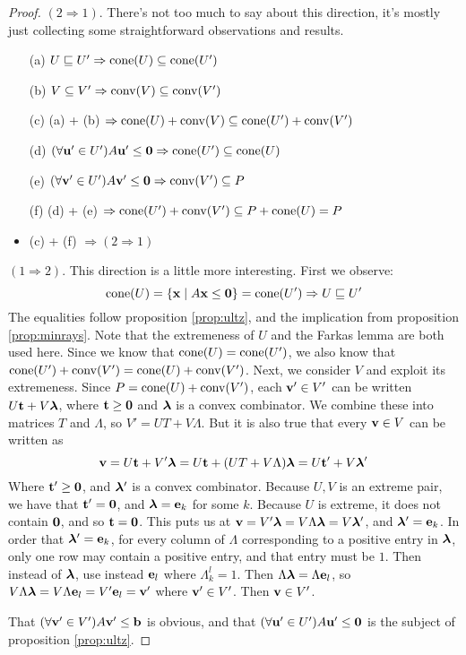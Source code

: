 \begin{proof}
	$(2 \Rightarrow 1)$.  There's not too much to say about this direction, it's mostly just collecting some straightforward observations and results.
	\begin{itemize}
		\item[(a)] $U \sqsubseteq U' \Rightarrow \operatorname{cone}(U) \subseteq \operatorname{cone}(U')$
		\item[(b)] $V \subseteq V' \Rightarrow \operatorname{conv}(V) \subseteq \operatorname{conv}(V')$
		\item[(c)] (a) + (b) $\Rightarrow \operatorname{cone}(U)+\operatorname{conv}(V) \subseteq \operatorname{cone}(U') + \operatorname{conv}(V')$
		\item[(d)] $(\forall \mathbf{u}'\in U') A\mathbf{u}' \leq \mathbf{0} \Rightarrow \operatorname{cone}(U') \subseteq \operatorname{cone}(U)$
		\item[(e)] $(\forall \mathbf{v}'\in U') A\mathbf{v}' \leq \mathbf{0} \Rightarrow \operatorname{conv}(V') \subseteq P$
		\item[(f)] (d) + (e) $\Rightarrow \operatorname{cone}(U') + \operatorname{conv}(V') \subseteq P + \operatorname{cone}(U) = P$
		\item (c) + (f) $\Rightarrow (2 \Rightarrow 1)$
	\end{itemize}

	$(1 \Rightarrow 2)$.  This direction is a little more interesting.  First we observe:
	\[ \operatorname{cone}(U) = \left\{\mathbf{x}\;|\; A\mathbf{x}\leq\mathbf{0}\right\} = \operatorname{cone}(U') \Rightarrow U \sqsubseteq U' \]
	The equalities follow proposition \ref{prop:ultz}, and the implication from proposition \ref{prop:minrays}.  Note that the extremeness of $U$ and the Farkas lemma are both used here.  Since we know that $\operatorname{cone}(U) = \operatorname{cone}(U')$, we also know that $\operatorname{cone}(U') + \operatorname{conv}(V') = \operatorname{cone}(U) + \operatorname{conv}(V')$.  Next, we consider $V$ and exploit its extremeness.  Since $P = \operatorname{cone}(U) + \operatorname{conv}(V')$, each $\mathbf{v}'\in V'$ can be written $U\mathbf{t} + V\bm{\lambda}$, where $\mathbf{t} \geq \mathbf{0}$ and $\bm{\lambda}$ is a convex combinator.  We combine these into matrices $T$ and $\Lambda$, so $V' = UT + V\Lambda$.  But it is also true that every $\mathbf{v}\in V$ can be written as
	\[ \mathbf{v} = U\mathbf{t} + V'\bm{\lambda} = U\mathbf{t} + (UT + V\Lambda)\bm{\lambda} = U\mathbf{t}' + V\bm{\lambda}' \]
	Where $\mathbf{t}'\geq\mathbf{0}$, and $\bm{\lambda}'$ is a convex combinator.  Because $U,V$ is an extreme pair, we have that $\mathbf{t}'=\mathbf{0}$, and $\bm{\lambda} = \mathbf{e}_k$ for some $k$.  Because $U$ is extreme, it does not contain $\mathbf{0}$, and so $\mathbf{t} = \mathbf{0}$.  This puts us at $\mathbf{v} = V'\bm{\lambda} = V\Lambda\bm{\lambda} = V\bm{\lambda}'$, and $\bm{\lambda}' = \mathbf{e}_k$.  In order that $\bm{\lambda}' = \mathbf{e}_k$, for every column of $\Lambda$ corresponding to a positive entry in $\bm{\lambda}$, only one row may contain a positive entry, and that entry must be $1$.  Then instead of $\bm{\lambda}$, use instead $\mathbf{e}_l$ where $\Lambda_k^l = 1$.  Then $\Lambda\bm{\lambda} = \Lambda\mathbf{e}_l$, so $V\Lambda\bm{\lambda} = V\Lambda\mathbf{e}_l = V'\mathbf{e}_l=\mathbf{v}'$ where $\mathbf{v}'\in V'$.  Then $\mathbf{v} \in V'$.

	That $(\forall \mathbf{v}'\in V')A\mathbf{v}'\leq\mathbf{b}$ is obvious, and that $(\forall\mathbf{u}'\in U') A\mathbf{u}'\leq\mathbf{0}$ is the subject of proposition \ref{prop:ultz}.
\end{proof}

